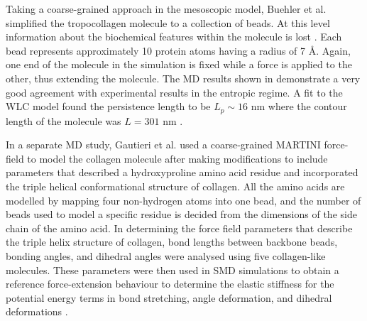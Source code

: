 Taking a coarse-grained approach in the mesoscopic model, Buehler et al. simplified the tropocollagen molecule to a collection of beads. At this level information about the biochemical features within the molecule is lost . Each bead represents approximately 10 protein atoms having a radius of 7 \AA. Again, one end of the molecule in the simulation is fixed while a force is applied to the other, thus extending the molecule. The MD results shown in  demonstrate a very good agreement with experimental results in the entropic regime. A fit to the WLC model found the persistence length to be $L_{p} \sim 16 \text{ nm}$ where the contour length of the molecule was $L = 301 \text{ nm}$ \cite{Buehler2007}.

In a separate MD study, Gautieri et al. used a coarse-grained MARTINI force-field to model the collagen molecule after making modifications to include parameters that described a hydroxyproline amino acid residue and incorporated the triple helical conformational structure of collagen. All the amino acids are modelled by mapping four non-hydrogen atoms into one bead, and the number of beads used to model a specific residue is decided from the dimensions of the side chain of the amino acid. In determining the force field parameters that describe the triple helix structure of collagen, bond lengths between backbone beads, bonding angles, and dihedral angles were analysed using five collagen-like molecules. These parameters were then used in SMD simulations to obtain a reference force-extension behaviour to determine the elastic stiffness for the potential energy terms in bond stretching, angle deformation, and dihedral deformations \cite{Gautieri2010}. 

